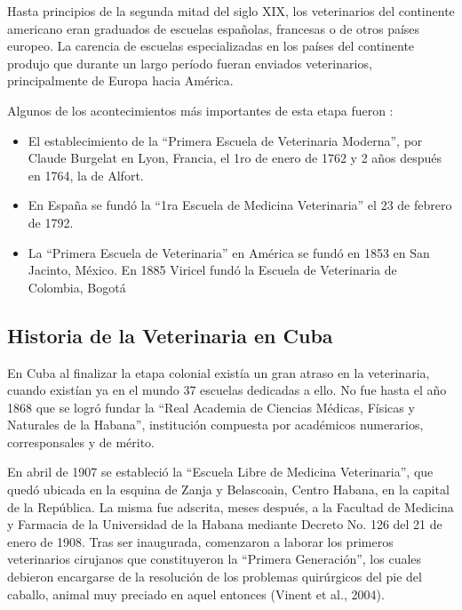 Hasta principios de la segunda mitad del siglo XIX, los veterinarios del continente americano eran graduados de escuelas españolas, francesas o de otros países europeo. La carencia de escuelas especializadas en los países del continente produjo que durante un largo período fueran enviados veterinarios, principalmente de Europa hacia América.  

Algunos de los acontecimientos más importantes de esta etapa fueron : 
\begin{itemize}
 \item El establecimiento de la “Primera Escuela de Veterinaria Moderna”, por Claude Burgelat en Lyon, Francia, el 1ro de enero de 1762 y 2 años después en 1764, la de Alfort.  
 \item En España se fundó la “1ra Escuela de Medicina Veterinaria” el 23 de febrero de 1792.  
 \item  La “Primera Escuela de Veterinaria” en América se fundó en 1853 en San Jacinto, México. En 1885 Viricel fundó la Escuela de Veterinaria de Colombia, Bogotá  
\end{itemize}
\newpage


\subsection{Historia de la Veterinaria en Cuba }

En Cuba al finalizar la etapa colonial existía un gran atraso en la veterinaria, cuando existían ya en el mundo 37 escuelas dedicadas a ello. No fue hasta el año 1868 que se logró fundar la “Real Academia de Ciencias Médicas, Físicas y Naturales de la Habana”, institución compuesta por académicos numerarios, corresponsales y de mérito.  

En abril de 1907 se estableció la “Escuela Libre de Medicina Veterinaria”, que quedó ubicada en la esquina de Zanja y Belascoain, Centro Habana, en la capital de la República. La misma fue adscrita, meses después, a la Facultad de Medicina y Farmacia de la Universidad de la Habana mediante Decreto No. 126 del 21 de enero de 1908. Tras ser inaugurada, comenzaron a laborar los primeros veterinarios cirujanos que constituyeron la “Primera Generación”, los cuales debieron encargarse de la resolución de los problemas quirúrgicos del pie del caballo, animal muy preciado en aquel entonces (Vinent et al., 2004).  

